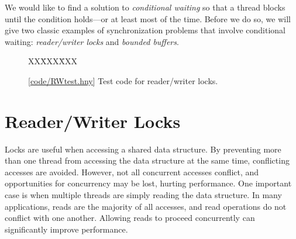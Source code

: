 \documentclass{report}
\newcommand{\harmonysource}[1]{
\begin{tabbing}
XX\=XXX\=XXX\kill
    
\end{tabbing}
}
\newcommand{\harmonylink}[1]{%
[\href{https://harmony.cs.cornell.edu/#1}{\underline{#1}}]%
}
\newenvironment{code}{
\tcolorbox
}{
\endtcolorbox
}
\begin{document}
We would like to find a solution to \emph{conditional waiting}
so that a thread blocks until the condition holds---or at least most
of the time.
Before we do so, we will give two classic examples of synchronization
problems that involve conditional waiting: \emph{reader/writer locks}
and \emph{bounded buffers}.

\begin{figure}
\begin{code}
\harmonysource{RWtest}
\end{code}
\caption{\harmonylink{code/RWtest.hny} Test code for reader/writer locks.}
\label{fig:rwtest}
\end{figure}

\section{Reader/Writer Locks}
%
%

Locks are useful when accessing a shared data structure.  By preventing
more than one thread from accessing the data structure at the same
time, conflicting accesses are avoided.  However, not all concurrent
accesses conflict, and opportunities for concurrency may be lost,
hurting performance.  One important case is when multiple threads
are simply reading the data structure.
In many applications, reads are the majority of all accesses,
and read operations do not conflict with one another.
Allowing reads to proceed concurrently can significantly improve performance.
\end{document}
